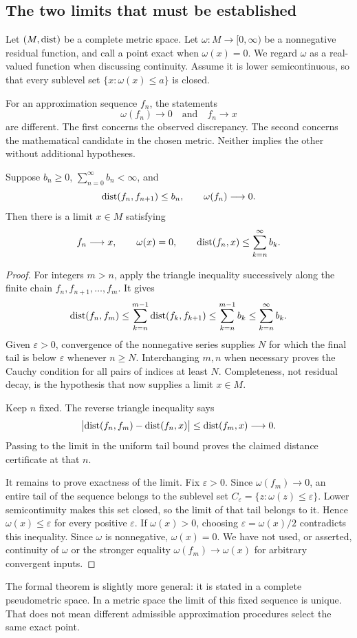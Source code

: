 \subsection{The two limits that must be established}
Let \((M,\operatorname{dist})\) be a complete metric space. Let \(\omega:M\to[0,\infty)\) be a nonnegative residual function, and call a point exact when \(\omega(x)=0\). We regard \(\omega\) as a real-valued function when discussing continuity. Assume it is lower semicontinuous, so that every sublevel set \(\{x:\omega(x)\le a\}\) is closed.

For an approximation sequence \(f_n\), the statements
\[
 \omega(f_n)\longrightarrow0
 \quad\text{and}\quad
 f_n\longrightarrow x
\]
are different. The first concerns the observed discrepancy. The second concerns the mathematical candidate in the chosen metric. Neither implies the other without additional hypotheses.

\begin{KStheorem}\label{KS:KS71}
Suppose \(b_n\ge0\), \(\sum_{n=0}^{\infty}b_n<\infty\), and
\[
 \operatorname{dist}(f_n,f_{n+1})\le b_n,\qquad \omega(f_n)\longrightarrow0.
\]
Then there is a limit \(x\in M\) satisfying
\[
 f_n\longrightarrow x,\qquad\omega(x)=0,\qquad
 \operatorname{dist}(f_n,x)\le\sum_{k=n}^{\infty}b_k.
\]
\end{KStheorem}
\begin{proof}
For integers \(m>n\), apply the triangle inequality successively along the finite chain \(f_n,f_{n+1},\ldots,f_m\). It gives
\[
 \operatorname{dist}(f_n,f_m)\le\sum_{k=n}^{m-1}\operatorname{dist}(f_k,f_{k+1})
 \le\sum_{k=n}^{m-1}b_k\le\sum_{k=n}^{\infty}b_k.
\]
Given \(\varepsilon>0\), convergence of the nonnegative series supplies \(N\) for which the final tail is below \(\varepsilon\) whenever \(n\ge N\). Interchanging \(m,n\) when necessary proves the Cauchy condition for all pairs of indices at least \(N\). Completeness, not residual decay, is the hypothesis that now supplies a limit \(x\in M\).

Keep \(n\) fixed. The reverse triangle inequality says
\[
 \bigl|\operatorname{dist}(f_n,f_m)-\operatorname{dist}(f_n,x)\bigr|\le\operatorname{dist}(f_m,x)\longrightarrow0.
\]
Passing to the limit in the uniform tail bound proves the claimed distance certificate at that \(n\).

It remains to prove exactness of the limit. Fix \(\varepsilon>0\). Since \(\omega(f_m)\to0\), an entire tail of the sequence belongs to the sublevel set \(C_\varepsilon=\{z:\omega(z)\le\varepsilon\}\). Lower semicontinuity makes this set closed, so the limit of that tail belongs to it. Hence \(\omega(x)\le\varepsilon\) for every positive \(\varepsilon\). If \(\omega(x)>0\), choosing \(\varepsilon=\omega(x)/2\) contradicts this inequality. Since \(\omega\) is nonnegative, \(\omega(x)=0\). We have not used, or asserted, continuity of \(\omega\) or the stronger equality \(\omega(f_m)\to\omega(x)\) for arbitrary convergent inputs.
\end{proof}
The formal theorem is slightly more general: it is stated in a complete pseudometric space. In a metric space the limit of this fixed sequence is unique. That does not mean different admissible approximation procedures select the same exact point.

